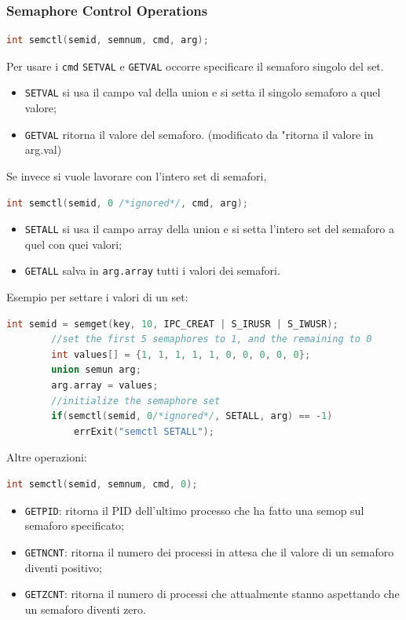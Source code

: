 \documentclass[a4paper, 12pt]{book}
\begin{document}
    \subsubsection{Semaphore Control Operations}

    \begin{lstlisting}[language=C]
        int semctl(semid, semnum, cmd, arg);
    \end{lstlisting}
    Per usare i \verb|cmd| \verb|SETVAL| e \verb|GETVAL|
    occorre specificare il semaforo singolo del set.
    \begin{itemize}
        \item \verb|SETVAL| si usa il campo val della 
        union e si setta il singolo semaforo a quel 
        valore;
        \item \verb|GETVAL| ritorna il valore del 
        semaforo. (modificato da "ritorna il valore in arg.val)
    \end{itemize}
    Se invece si vuole lavorare con l'intero set di semafori,
    \begin{lstlisting}[language=C]
        int semctl(semid, 0 /*ignored*/, cmd, arg);
    \end{lstlisting}
    \begin{itemize}
        \item \verb|SETALL| si usa il campo array della 
        union e si setta l'intero set del semaforo a quel 
        con quei valori;
        \item \verb|GETALL| salva in \verb|arg.array| tutti 
        i valori dei semafori.
    \end{itemize}
    Esempio per settare i valori di un set:
    \begin{lstlisting}[language=C]
        int semid = semget(key, 10, IPC_CREAT | S_IRUSR | S_IWUSR);
        //set the first 5 semaphores to 1, and the remaining to 0
        int values[] = {1, 1, 1, 1, 1, 0, 0, 0, 0, 0};
        union semun arg;
        arg.array = values;
        //initialize the semaphore set 
        if(semctl(semid, 0/*ignored*/, SETALL, arg) == -1)
            errExit("semctl SETALL");
    \end{lstlisting}
    Altre operazioni:
    \begin{lstlisting}[language=C]
        int semctl(semid, semnum, cmd, 0);
    \end{lstlisting}
    \begin{itemize}
        \item \verb|GETPID|: ritorna il PID dell'ultimo 
        processo che ha fatto una semop sul semaforo specificato;
        \item \verb|GETNCNT|: ritorna il numero dei processi 
        in attesa che il valore di un semaforo diventi positivo;
        \item \verb|GETZCNT|: ritorna il numero di processi che 
        attualmente stanno aspettando che un semaforo diventi 
        zero.
    \end{itemize}
    
\end{document}
